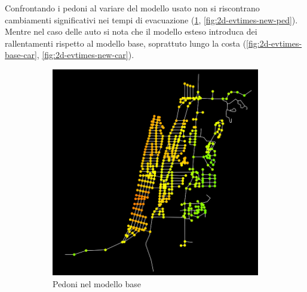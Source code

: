 Confrontando i pedoni al variare del modello usato non si riscontrano cambiamenti significativi nei tempi di evacuazione (\ref{fig:2d-evtimes-base-ped}, \ref{fig:2d-evtimes-new-ped}).
Mentre nel caso delle auto si nota che il modello esteso introduca dei rallentamenti rispetto al modello base, soprattuto lungo la costa (\ref{fig:2d-evtimes-base-car}, \ref{fig:2d-evtimes-new-car}).


\begin{figure}[ht]
    \centering
    \begin{subfigure}{0.45\textwidth}
        \centering
        \includegraphics[width=\textwidth]{images/analisi/comparison-ev-times-map-base-ped.png}
        \caption{Pedoni nel modello base}
        \label{fig:2d-evtimes-base-ped}
    \end{subfigure}
    \hfill
    \begin{subfigure}{0.45\textwidth}
        \centering

\end{subfigure}
\end{figure}
